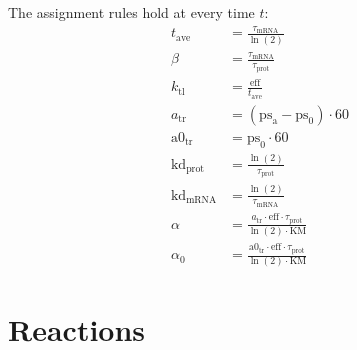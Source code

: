 \documentclass{article}
\begin{document}
The assignment rules hold at every time $t$:
\begin{align*}
  t_{\mathrm{ave}} &= \frac{\tau_{\mathrm{mRNA}}}{\ln\mathopen{}\left(2\right)} \\
  \beta &= \frac{\tau_{\mathrm{mRNA}}}{\tau_{\mathrm{prot}}} \\
  k_{\mathrm{tl}} &= \frac{\mathrm{eff}}{t_{\mathrm{ave}}} \\
  a_{\mathrm{tr}} &= \mathopen{}\left(\mathrm{ps}_{\mathrm{a}} - \mathrm{ps}_{0}\right) \cdot 60 \\
  \mathrm{a0}_{\mathrm{tr}} &= \mathrm{ps}_{0} \cdot 60 \\
  \mathrm{kd}_{\mathrm{prot}} &= \frac{\ln\mathopen{}\left(2\right)}{\tau_{\mathrm{prot}}} \\
  \mathrm{kd}_{\mathrm{mRNA}} &= \frac{\ln\mathopen{}\left(2\right)}{\tau_{\mathrm{mRNA}}} \\
  \alpha &= \frac{a_{\mathrm{tr}} \cdot \mathrm{eff} \cdot \tau_{\mathrm{prot}}}{\ln\mathopen{}\left(2\right) \cdot \mathrm{KM}} \\
  \alpha_{0} &= \frac{\mathrm{a0}_{\mathrm{tr}} \cdot \mathrm{eff} \cdot \tau_{\mathrm{prot}}}{\ln\mathopen{}\left(2\right) \cdot \mathrm{KM}}
\end{align*}

\section{Reactions}
\end{document}
